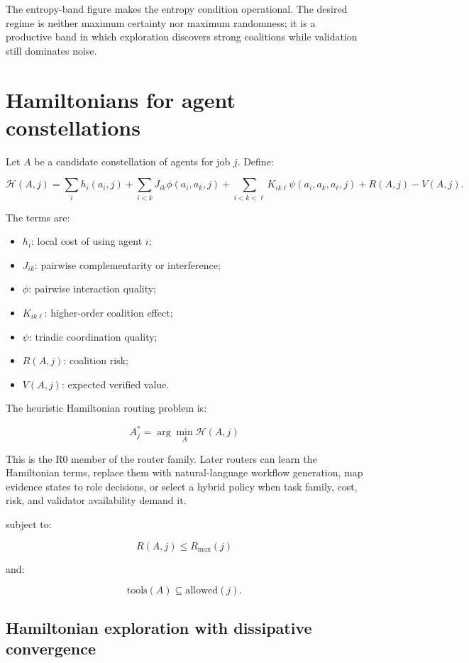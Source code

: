 \documentclass[11pt]{article}
\providecommand{\tightlist}{\setlength{\itemsep}{0pt}\setlength{\parskip}{0pt}}
\begin{document}
The entropy-band figure makes the entropy condition operational. The
desired regime is neither maximum certainty nor maximum randomness; it
is a productive band in which exploration discovers strong coalitions
while validation still dominates noise.

\section{Hamiltonians for agent
constellations}\label{hamiltonians-for-agent-constellations}

Let \(A\) be a candidate constellation of agents for job \(j\). Define:

\[
\mathcal{H}(A,j)=
\sum_i h_i(a_i,j)
+
\sum_{i<k}J_{ik}\phi(a_i,a_k,j)
+
\sum_{i<k<\ell}K_{ik\ell}\psi(a_i,a_k,a_\ell,j)
+R(A,j)-V(A,j).
\]

The terms are:

\begin{itemize}
\tightlist
\item
  \(h_i\): local cost of using agent \(i\);
\item
  \(J_{ik}\): pairwise complementarity or interference;
\item
  \(\phi\): pairwise interaction quality;
\item
  \(K_{ik\ell}\): higher-order coalition effect;
\item
  \(\psi\): triadic coordination quality;
\item
  \(R(A,j)\): coalition risk;
\item
  \(V(A,j)\): expected verified value.
\end{itemize}

The heuristic Hamiltonian routing problem is:

\[
A^*_j=\arg\min_A\mathcal{H}(A,j)
\]

This is the R0 member of the router family. Later routers can learn the
Hamiltonian terms, replace them with natural-language workflow
generation, map evidence states to role decisions, or select a hybrid
policy when task family, cost, risk, and validator availability demand
it.

subject to:

\[
R(A,j)\leq R_{\max}(j)
\]

and:

\[
\text{tools}(A)\subseteq \text{allowed}(j).
\]

\subsection{Hamiltonian exploration with dissipative
convergence}\label{hamiltonian-exploration-with-dissipative-convergence}
\end{document}

